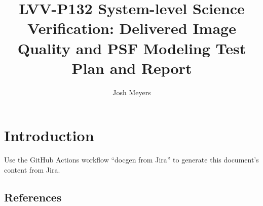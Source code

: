 \documentclass[DM,lsstdraft,toc]{lsstdoc}
\begin{document}
\def\milestoneName{System-level Science Verification: Delivered Image Quality and PSF Modeling}
\def\milestoneId{LVV-P132}
\def\product{Data Management}


\title{LVV-P132 System-level Science Verification: Delivered Image Quality and PSF Modeling Test Plan and Report}
\setDocRef{\lsstDocType-\lsstDocNum}
\date{\vcsDate}
\author{Josh Meyers}




\maketitle

\section{Introduction}
Use the GitHub Actions workflow ``docgen from Jira'' to generate this document's content from Jira.

\subsection{References}
\label{sect:references}
\renewcommand{\refname}{}




\end{document}
